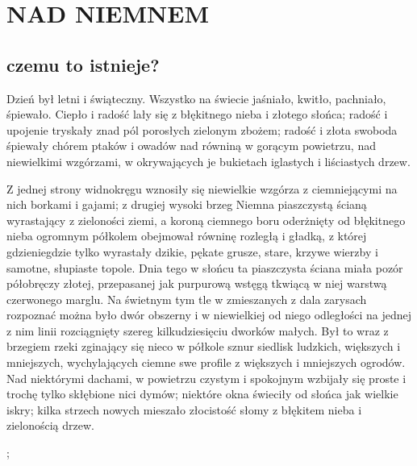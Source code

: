 \documentclass{article}
\begin{document}
\section{NAD NIEMNEM}
\subsection{czemu to istnieje?}

Dzień {\color{def}był letni i świąteczny}. Wszystko na świecie jaśniało, kwitło, pachniało, śpiewało. Ciepło i radość lały się z błękitnego nieba i złotego słońca; radość i upojenie tryskały znad pól porosłych zielonym zbożem; radość i złota swoboda śpiewały chórem ptaków i owadów nad równiną w gorącym powietrzu, nad {\color{acc}niewielkimi wzgórzami, w okrywających} je bukietach iglastych i liściastych drzew.\bigskip

\bigskip

Z jednej strony widnokręgu wznosiły się niewielkie wzgórza z ciemniejącymi na nich borkami i gajami; z drugiej wysoki brzeg Niemna piaszczystą ścianą wyrastający z zieloności ziemi, a koroną ciemnego boru oderżnięty od błękitnego nieba ogromnym półkolem obejmował równinę rozległą i gładką, z której gdzieniegdzie tylko wyrastały dzikie, pękate grusze, stare, krzywe wierzby i samotne, słupiaste topole. Dnia tego w słońcu ta piaszczysta ściana miała pozór półobręczy złotej, przepasanej jak purpurową wstęgą tkwiącą w niej warstwą czerwonego marglu. Na świetnym tym tle w zmieszanych z dala zarysach rozpoznać można było dwór obszerny i w niewielkiej od niego odległości na jednej z nim linii rozciągnięty szereg kilkudziesięciu dworków małych. Był to wraz z brzegiem rzeki zginający się nieco w półkole sznur siedlisk ludzkich, większych i mniejszych, wychylających ciemne swe profile z większych i mniejszych ogrodów. Nad niektórymi dachami, w powietrzu czystym i spokojnym wzbijały się proste i trochę tylko skłębione nici dymów; niektóre okna świeciły od słońca jak wielkie iskry; kilka strzech nowych mieszało złocistość słomy z błękitem nieba i zielonością drzew.

\pgraf
        ;
    \kaxis
\kgraf
\end{document}
